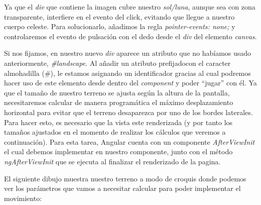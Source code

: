 Ya que el \emph{div} que contiene la imagen cubre nuestro \emph{sol/luna}, aunque sea con zona transparente, interfiere en el evento del click, evitando que llegue a nuestro cuerpo celeste. Para solucionarlo, añadimos la regla \emph{pointer-events: none;} y controlaremos el evento de pulsación con el dedo desde el  \emph{div} del elemento \emph{canvas}.

Si nos fijamos, en nuestro nuevo \emph{div} aparece un atributo que no habíamos usado anteriormente, \emph{\#landscape}. Al añadir un atributo prefijadocon el caracter almohadilla (\#), le estamos asignando un identificador gracias al cual podremos hacer uso de este elemento desde dentro del \emph{component} y poder ``jugar'' con él. Ya que el tamaño de nuestro terreno se ajusta según la altura de la pantalla, necesitaremos calcular de manera programática el máximo desplazamiento horizontal para evitar que el terreno desaparezca por uno de los bordes laterales. Para hacer esto, es necesario que la vista este renderizada (y por tanto los tamaños ajustados en el momento de realizar los cálculos que veremos a continuación). Para esta tarea, Angular cuenta con un componente \emph{AfterViewInit} el cual debemos implementar en nuestro componente, junto con el método \emph{ngAfterViewInit} que se ejecuta al finalizar el renderizado de la pagina.


El siguiente dibujo muestra nuestro terreno a modo de croquis donde podemos ver los parámetros que vamos a necesitar calcular para poder implementar el movimiento:


